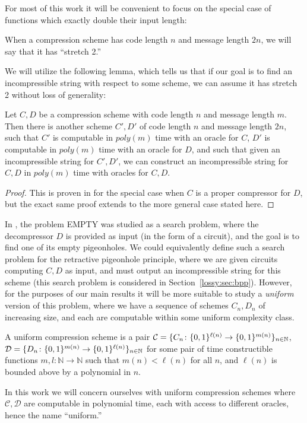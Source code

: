 For most of this work it will be convenient to focus on the special case of functions which exactly double their input length:
\begin{definition}
When a compression scheme has code length $n$ and message length $2n$, we will say that it has ``stretch 2.''
\end{definition}

We will utilize the following lemma, which tells us that if our goal is to find an incompressible string with respect to some scheme, we can assume it has stretch 2 without loss of generality:
\begin{lemma}\label{lossy:lem:non-uniform-stretching}
Let $C,D$ be a compression scheme with code length $n$ and message length $m$. Then there is another scheme $C',D'$ of code length $n$ and message length $2n$, such that $C'$ is computable in $poly(m)$ time with an oracle for $C$, $D'$ is computable in $poly(m)$ time with an oracle for $D$, and such that given an incompressible string for $C',D'$, we can construct an incompressible string for $C,D$ in $poly(m)$ time with oracles for $C,D$.
\end{lemma}
\begin{proof}
This is proven in \cite{Korten} for the special case when $C$ is a proper compressor for $D$, but the exact same proof extends to the more general case stated here.
\end{proof}

In \cite{Korten}, the problem {\sc EMPTY} was studied as a search problem, where the decompressor $D$ is provided as input (in the form of a circuit), and the goal is to find one of its empty pigeonholes. We could equivalently define such a search problem for the retractive pigeonhole principle, where we are given circuits computing $C,D$ as input, and must output an incompressible string for this scheme (this search problem is considered in Section~\ref{lossy:sec:bpp}). However, for the purposes of our main results it will be more suitable to study a \emph{uniform} version of this problem, where we have a sequence of schemes $C_n,D_n$ of increasing size, and each are computable within some uniform complexity class.
\begin{definition}
A uniform compression scheme is a pair $\mathcal{C} = \{C_n\colon \{0,1\}^{\ell(n)} \rightarrow \{0,1\}^{m(n)}\}_{n \in \mathbb{N}}$, $\mathcal{D} = \{D_n\colon \{0,1\}^{m(n)} \rightarrow \{0,1\}^{\ell(n)}\}_{n \in \mathbb{N}}$ for some pair of time constructible functions $m,l\colon\mathbb{N} \rightarrow \mathbb{N}$ such that $m(n) < \ell(n)$ for all $n$, and $\ell(n)$ is bounded above by a polynomial in $n$.
\end{definition}
In this work we will concern ourselves with uniform compression schemes where $\mathcal{C},\mathcal{D}$ are computable in polynomial time, each with access to different oracles, hence the name ``uniform.''

